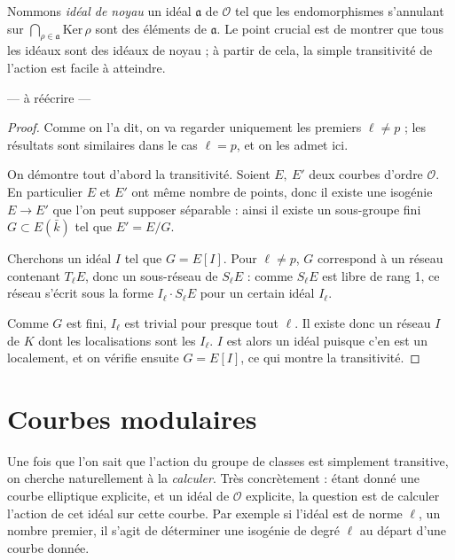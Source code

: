 \documentclass[11pt,a4paper]{article}
\renewcommand{\O}{\mathcal{O}}
\newcommand{\vers}{\longrightarrow}
\newcommand{\Ker}{\mathrm{Ker}\,}
\renewcommand{\frak}{\mathfrak}
\theoremstyle{definition}
\begin{document}
Nommons \emph{idéal de noyau} un idéal $\frak a$ de $\O$ tel que les endomorphismes s'annulant sur $\bigcap_{\rho\in \frak a} \Ker\rho$ sont des éléments de $\frak a$. Le point crucial est de montrer que tous les idéaux sont des idéaux de noyau ; à partir de cela, la simple transitivité de l'action est facile à atteindre.

--- à réécrire ---


\begin{proof}

Comme on l'a dit, on va regarder uniquement les premiers $\ell\neq p$ ; les résultats sont similaires dans le cas $\ell = p$, et on les admet ici.

On démontre tout d'abord la transitivité. Soient $E,\ E'$ deux courbes d'ordre $\O$. En particulier $E$ et $E'$ ont même nombre de points, donc il existe une isogénie $E \vers E'$ que l'on peut supposer séparable : ainsi il existe un sous-groupe fini $G\subset E(\bar{k})$ tel que $E' = E/G$.

Cherchons un idéal $I$ tel que $G = E[I]$. Pour $\ell\neq p$, $G$ correspond à un réseau contenant $T_\ell E$, donc un sous-réseau de $S_\ell E$ : comme $S_\ell E$ est libre de rang 1, ce réseau s'écrit sous la forme $I_\ell \cdot S_\ell E$ pour un certain idéal $I_\ell$.

Comme $G$ est fini, $I_\ell$ est trivial pour presque tout $\ell$. Il existe donc un réseau $I$ de $K$ dont les localisations sont les $I_\ell$. $I$ est alors un idéal puisque c'en est un localement, et on vérifie ensuite $G = E[I]$, ce qui montre la transitivité.

\end{proof}





\newpage

\section{Courbes modulaires}

Une fois que l'on sait que l'action du groupe de classes est simplement transitive, on cherche naturellement à la \emph{calculer}. Très concrètement : étant donné une courbe elliptique explicite, et un idéal de $\O$ explicite, la question est de calculer l'action de cet idéal sur cette courbe. Par exemple si l'idéal est de norme $\ell$, un nombre premier, il s'agit de déterminer une isogénie de degré $\ell$ au départ d'une courbe donnée.
\end{document}

